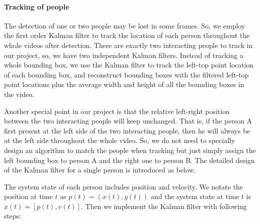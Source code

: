 \paragraph*{Tracking of people}
\label{Kalman} 
The detection of one or two people may be lost in some frames. So, we employ the first order Kalman filter to track the location of each person throughout the whole videos after detection. There are exactly two interacting people to track in our project, so, we have two independent Kalman filters. Instead of tracking a whole bounding box, we use the Kalman filter to track the left-top point location of each bounding box, and reconstruct bounding boxes with the filtered left-top point locations plus the average width and height of all the bounding boxes in the video.  
\par 
Another special point in our project is that the relative left-right position between the two interacting people will keep unchanged. That is, if the person A first present at the left side of the two interacting people, then he will always be at the left side throughout the whole video.  So, we do not need to specially design an algorithm to match the people when tracking but just simply assign the left bounding box to person A and the right one to person B.  The detailed design of the Kalman filter for a single person is introduced as below.
\par
The system state of each person includes position and velocity. We notate the position at time \(t\) as \(p(t) = (x(t),y(t))\) and the system state at time \(t\) is \(x(t) = [p(t), v(t)]\). Then we implement the Kalman filter with following steps:
